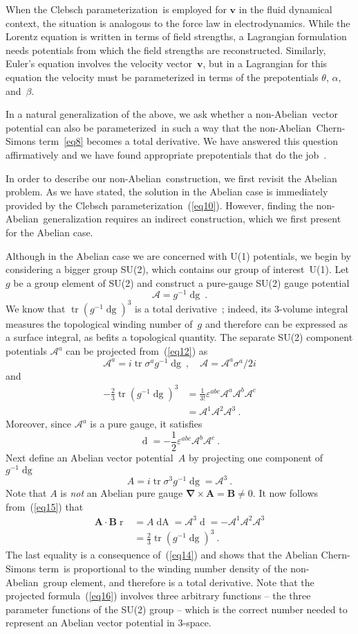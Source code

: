 \documentclass[a4paper,12pt,twoside]{article}
\newcommand{\rd}[1]{\mathop{\mathrm{d}#1}}
\newcommand{\tr}{\mathop{\mathrm{tr}}}
\newcommand{\fract}[2]{{\textstyle\frac{#1}{#2}}}
\newcommand{\grad}{\vec\nabla}
\newcommand{\nA}{non-Abelian}
\newcommand{\CSt}{Chern-Simons term}
\newcommand{\Cpr}{Clebsch pa\-ra\-me\-ter\-iza\-tion}
\newcommand{\prd}{para\-me\-ter\-ized}
\newcommand{\gdg}{g^{-1} \rd g}
\newcommand{\A}{\mathcal A}
\newcommand{\numeq}[2]{\begin{equation}
#2
\label{#1}
\end{equation}}
\newcommand{\refeq}[1]{(\ref{#1})}
\let\vec\boldsymbol
\let\eps\varepsilon
\begin{document}
When the \Cpr\ is employed for $\vec v$ in the fluid dynamical context, the
situation is analogous to the force law in electrodynamics. While the Lorentz equation
is written in terms of field strengths, a Lagrangian formulation needs potentials from
which the field strengths are reconstructed. Similarly, Euler's equation involves the
velocity vector~$\vec v$, but in a Lagrangian for this equation the velocity must be
parameterized in terms of the  prepotentials $\theta$, $\alpha$, and~$\beta$. 

In a natural generalization of the above, we ask whether a \nA\ vector potential
can also be \prd\ in such a way that the \nA\ \CSt~\eqref{eq8} becomes a total
derivative. We have answered this question affirmatively and we have found
appropriate prepotentials that do the job~\cite{ref10,ref13,ref14}.

In order to describe our \nA\ construction, we first revisit the Abelian problem. As
we have stated, the solution in the Abelian case is immediately provided by the
\Cpr~\refeq{eq10}. However, finding the \nA\ generalization requires an indirect
construction, which we first present for the Abelian case.

Although in the Abelian case we are concerned with U(1) potentials, we begin by
considering a bigger group SU(2), which contains our group of interest~U(1).  Let~$g$
be a group element of SU(2) and construct a pure-gauge SU(2) gauge potential
\numeq{eq12}{
{\A} = g^{-1} \rd g\ . 
}
We know that $\tr(\gdg)^3$ is a total derivative~\cite{ref7}; indeed, its 3-volume
integral  measures the topological winding number of~$g$ and therefore can be
expressed as a surface integral, as befits a topological quantity. The separate SU(2)
component potentials $\A^a$ can be projected from~\refeq{eq12} as
\numeq{eq13}{
\mathcal A^a= i\tr \sigma^a \gdg\ , \quad
\mathcal A = \mathcal A^a \sigma^a/2i
}
and
\begin{align}
-\fract23 \tr(\gdg)^3 &= \frac1{3!} \eps^{abc} \mathcal A^a \mathcal A^b \mathcal
A^c \nonumber\\
&= \A^1 \A^2 \A^3\ .
\label{eq14} 
\end{align}
Moreover, since $\A^a$ is a pure gauge, it satisfies
\numeq{eq15}{
\rd{\A^a} = -\fract12 \eps^{abc} \A^b \A^c \ .
}
Next define an Abelian vector potential~$A$ by projecting one component of $\gdg$
\numeq{eq16}{
A = i \tr \sigma^3 \gdg = \A^3\ .
}
Note that $A$ is \emph{not} an Abelian pure gauge $\grad\times\vec A = \vec B
\neq0$. It now follows from~\refeq{eq15} that 
\begin{align}
\vec A\cdot\vec B \rd{^3 r} &= A\rd A = \A^3\rd{\A^3} =
-\A^1\A^2\A^3\nonumber\\
&= \fract23 \tr(\gdg)^3\ .
\label{eq17}
\end{align}
The last equality is a consequence of~\refeq{eq14} and shows that the Abelian \CSt\
is proportional to the winding number density of the \nA\ group element, and
therefore is  a total derivative. Note that the projected formula~\refeq{eq16} involves
three arbitrary functions -- the three parameter functions of the SU(2) group --
which is the correct number needed to represent an Abelian vector potential in
3-space.
\end{document}

